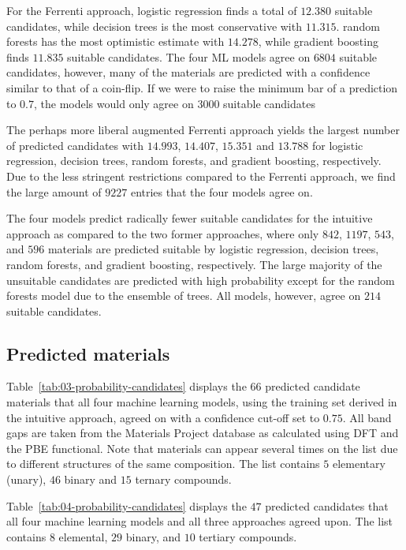 \documentclass[superscriptaddress,unsortedaddress,
 amsmath,amssymb,
 aps,
]{revtex4-2}
\begin{document}
For the Ferrenti approach, logistic regression finds a total of $12.380$ suitable candidates, while decision trees is the most conservative with $11.315$. random forests has the most optimistic estimate with $14.278$, while gradient boosting finds $11.835$ suitable candidates. The four ML models agree on $6804$ suitable candidates, however, many of the materials
are predicted with a confidence similar to that of a coin-flip.
If we were to raise the minimum bar of a prediction to
$0.7$, the models would only agree on $3000$ suitable candidates

The perhaps more liberal augmented Ferrenti approach yields the largest number of predicted candidates with $14.993$, $14.407$, $15.351$ and $13.788$ for logistic regression, decision trees, random forests, and gradient boosting, respectively. Due to the less stringent restrictions compared to the Ferrenti approach, we find the large amount of $9227$ entries that the four models agree on.

The four models predict radically fewer suitable candidates for the intuitive approach as compared to the two former approaches, where only $842$, $1197$, $543$, and $596$ materials are predicted suitable by logistic regression, decision trees, random forests, and gradient boosting, respectively. The large majority of the unsuitable candidates are predicted with high probability except for the random forests model due to the ensemble of trees. All models, however, agree on $214$ suitable candidates. 

\subsection*{Predicted materials}

Table~\ref{tab:03-probability-candidates} displays the $66$ predicted candidate materials that all four machine learning models, using the training set derived in the intuitive approach, agreed on with a confidence cut-off set to $0.75$. All band gaps are taken from the Materials Project database as calculated using DFT and the PBE functional. Note that materials can appear several times  on  the  list due  to  different  structures of the same composition. The  list  contains $5$ elementary (unary), $46$  binary and  $15$ ternary compounds. 



Table~\ref{tab:04-probability-candidates} displays the $47$ predicted candidates that all four machine learning models and all three approaches agreed upon. 
The list contains $8$ elemental, $29$ binary, and $10$ tertiary compounds.
\end{document}
